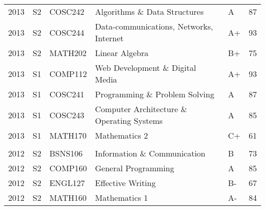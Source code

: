\documentclass[a4paper, oneside, final]{scrartcl}
\begin{document}
\begin{table}[h]
\begin{tabular}{llllll}
        2013 & S2  & COSC242 & Algorithms \& Data Structures                   & A     & 87      \\
        2013 & S2  & COSC244 & Data-communications, Networks, Internet         & A+    & 93      \\
        2013 & S2  & MATH202 & Linear Algebra                                  & B+    & 75      \\
        2013 & S1  & COMP112 & Web Development \& Digital Media                & A+    & 93      \\
        2013 & S1  & COSC241 & Programming \& Problem Solving                  & A     & 87      \\
        2013 & S1  & COSC243 & Computer Architecture \& Operating Systems      & A     & 85      \\
        2013 & S1  & MATH170 & Mathematics 2                                   & C+    & 61      \\
             &     &         &                                                 &       &         \\
        2012 & S2  & BSNS106 & Information \& Communication                    & B     & 73      \\
        2012 & S2  & COMP160 & General Programming                             & A     & 85      \\
        2012 & S2  & ENGL127 & Effective Writing                               & B-    & 67      \\
        2012 & S2  & MATH160 & Mathematics 1                                   & A-    & 84      \\
        \end{tabular}
      \end{table}
    \fi
\end{document}
